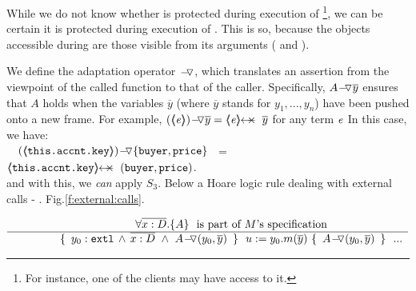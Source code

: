 
While we do not know whether  is protected during  execution of \footnote{For instance, one of the clients may have access to it.}, we can be certain it is protected during execution of .  This is so, because the objects accessible during  are those visible from its arguments (\ie {} and ).

We define the adaptation operator $\FIXSymbolA$, which translates an assertion from the viewpoint of the called function to that of the caller. 
Specifically, $\PushAS y A$ ensures that $A$ holds when the variables $\overline{y}$ (where $\overline{y}$ stands for $y_1, ..., y_n$) have been pushed onto a new frame. 
For example, $\PushAS y {(\inside \re)} = \protectedFrom \re {\overline{y}}$ for any term $\re$  
%
In this case, we have:\\  {\small{$\strut \ \ \ \PushASLong {\{\prg{buyer},\prg{price}\}}  {(\inside {\prg{this.\myAccount.key}})}$
 \ = \  $\protectedFrom {\prg{this.\myAccount.key}} {(\prg{buyer},\prg{price})}$.}}
 \\
 and with this, we \emph{can} apply $S_3$.
 {Below  a  Hoare logic rule  dealing with external calls - \cf. Fig.\ref{f:external:calls}.} %
 
 $\inferruleNoName  
 	{ 
   	   {\TwoStatesN {\overline {x:D}} {A}}\ \   \mbox{is part of $M$'s specification}
        }
	{   \triple { \    { \external{y_0}} \,     \wedge \,  \overline{x:D}\  \wedge\  {\PushASLong {(y_0,\overline y)}{A}} \ }  
						{ \ u:=y_0.m(\overline y)\    }
						{ \    {\PushASLong {(y_0,\overline y)}{A}}  \ }
						\  \  ...
         }
$

 
 
